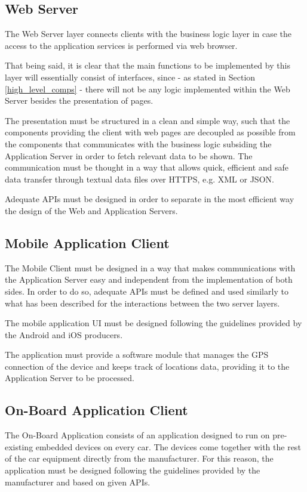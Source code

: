 \subsection{Web Server}
The Web Server layer connects clients with the business logic layer in case the access to the application services is performed via web browser.

That being said, it is clear that the main functions to be implemented by this layer will essentially consist of interfaces, since - as stated in Section \ref{high_level_comps} - there will not be any logic implemented within the Web Server besides the presentation of pages.

The presentation must be structured in a clean and simple way, such that the components providing the client with web pages are decoupled as possible from the components that communicates with the business logic subsiding the Application Server in order to fetch relevant data to be shown. The communication must be thought in a way that allows quick, efficient and safe data transfer through textual data files over HTTPS, e.g. XML or JSON.

Adequate APIs must be designed in order to separate in the most efficient way the design of the Web and Application Servers.

\subsection{Mobile Application Client}
The Mobile Client must be designed in a way that makes communications with the Application Server easy and independent from the implementation of both sides. In order to do so, adequate APIs must be defined and used similarly to what has been described for the interactions between the two server layers.

The mobile application UI must be designed following the guidelines provided by the Android and iOS producers.

The application must provide a software module that manages the GPS connection of the device and keeps track of locations data, providing it to the Application Server to be processed.

\subsection{On-Board Application Client}
The On-Board Application consists of an application designed to run on pre-existing embedded devices on every car. The devices come together with the rest of the car equipment directly from the manufacturer. For this reason, the application must be designed following the guidelines provided by the manufacturer and based on given APIs.

